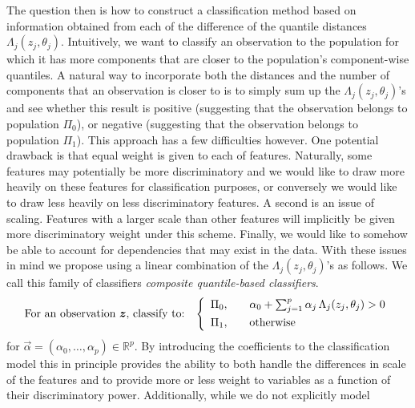 The question then is how to construct a classification method based on
information obtained from each of the difference of the quantile distances
$\Lambda_j(z_j, \theta_j)$.  Intuitively, we want to classify an observation to
the population for which it has more components that are closer to the
population's component-wise quantiles.  A natural way to incorporate both the
distances and the number of components that an observation is closer to is to
simply sum up the $\Lambda_j(z_j, \theta_j)$'s and see whether this result is
positive (suggesting that the observation belongs to population $\Pi_0$), or
negative (suggesting that the observation belongs to population $\Pi_1$).  This
approach has a few difficulties however.  One potential drawback is that equal
weight is given to each of features.  Naturally, some features may potentially
be more discriminatory and we would like to draw more heavily on these features
for classification purposes, or conversely we would like to draw less heavily on
less discriminatory features.  A second is an issue of scaling.  Features with a
larger scale than other features will implicitly be given more discriminatory
weight under this scheme.  Finally, we would like to somehow be able to account
for dependencies that may exist in the data.  With these issues in mind we
propose using a linear combination of the $\Lambda_j(z_j, \theta_j)$'s as
follows.  We call this family of classifiers \emph{composite quantile-based
  classifiers}.
\begin{equation}
  \label{eq:varying-coefficient-classifier}
  \text{For an observation $\vec{z}$, classify to:} \hspace{3mm}
  \left\{
    \begin{array}{lll}
      \Pi_0, & & %
                 \alpha_0 + \sum_{j=1}^p \alpha_j \,
                 \Lambda_j (z_j, \theta_j) > 0 \\[1ex]
      \Pi_1, & & \text{otherwise}
    \end{array}
  \right.
\end{equation}
for $\vec{\alpha} = (\alpha_0, \dots, \alpha_p) \in \mathbb{R}^p$. By
introducing the coefficients to the classification model this in principle
provides the ability to both handle the differences in scale of the features and
to provide more or less weight to variables as a function of their
discriminatory power. Additionally, while we do not explicitly model
